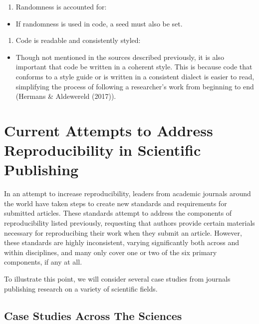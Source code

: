 \documentclass[12pt,twoside]{reedthesis}
\providecommand{\tightlist}{%
  \setlength{\itemsep}{0pt}\setlength{\parskip}{0pt}}
\begin{document}
\begin{enumerate}
\def\labelenumi{\arabic{enumi}.}
\setcounter{enumi}{4}
\tightlist
\item
  Randomness is accounted for:
\end{enumerate}
\begin{itemize}
\tightlist
\item
  If randomness is used in code, a seed must also be set.
\end{itemize}
\begin{enumerate}
\def\labelenumi{\arabic{enumi}.}
\setcounter{enumi}{5}
\tightlist
\item
  Code is readable and consistently styled:
\end{enumerate}
\begin{itemize}
\tightlist
\item
  Though not mentioned in the sources described previously, it is also
  important that code be written in a coherent style. This is because
  code that conforms to a style guide or is written in a consistent
  dialect is easier to read, simplifying the process of following a
  researcher's work from beginning to end (Hermans \& Aldewereld
  (2017)).
\end{itemize}
\section{Current Attempts to Address Reproducibility in Scientific
Publishing}\label{current-attempts-to-address-reproducibility-in-scientific-publishing}

In an attempt to increase reproducibility, leaders from academic
journals around the world have taken steps to create new standards and
requirements for submitted articles. These standards attempt to address
the components of reproducibility listed previously, requesting that
authors provide certain materials necessary for reproducibing their work
when they submit an article. However, these standards are highly
inconsistent, varying significantly both across and within disciplines,
and many only cover one or two of the six primary components, if any at
all.

To illustrate this point, we will consider several case studies from
journals publishing research on a variety of scientific fields.

\subsection{Case Studies Across The
Sciences}\label{case-studies-across-the-sciences}
\end{document}
